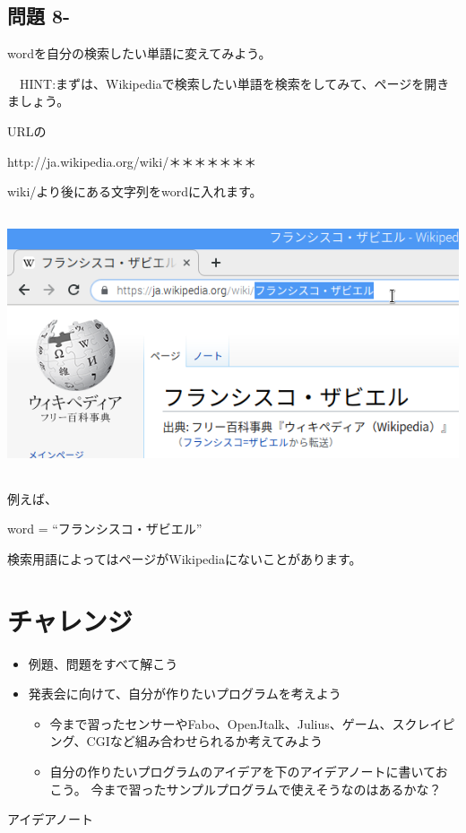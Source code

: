 \documentclass[a4paper,12pt,dvipdfmx]{jarticle}
\newcounter{Question}
\renewcommand\theQuestion{\textbf{問題 8-\arabic{Question}}}
\begin{document}
\bigskip

\subsection*{\theQuestion}
wordを自分の検索したい単語に変えてみよう。

\ \ HINT:まずは、Wikipediaで検索したい単語を検索をしてみて、ページを開きましょう。

URLの

http://ja.wikipedia.org/wiki/＊＊＊＊＊＊＊

wiki/より後にある文字列をwordに入れます。



\begin{center}
\includegraphics[width=16.016cm,height=7.684cm]{textbook-img062.png}

\end{center}
例えば、

word = “フランシスコ・ザビエル”

検索用語によってはページがWikipediaにないことがあります。


\bigskip

\clearpage\section{チャレンジ}
\begin{itemize}
\item 例題、問題をすべて解こう
\item
発表会に向けて、自分が作りたいプログラムを考えよう

\begin{itemize}
\item
今まで習ったセンサーやFabo、OpenJtalk、Julius、ゲーム、スクレイピング、CGIなど組み合わせられるか考えてみよう
\item
自分の作りたいプログラムのアイデアを下のアイデアノートに書いておこう。
		今まで習ったサンプルプログラムで使えそうなのはあるかな？
\end{itemize}
\end{itemize}
アイデアノート
\end{document}
